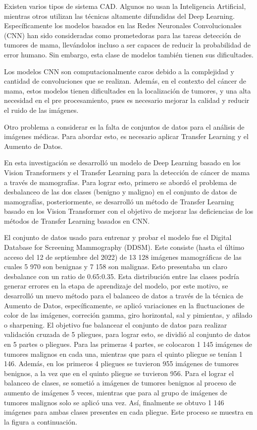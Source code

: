 Existen varios tipos de sistema CAD. Algunos no usan la Inteligencia Artificial, mientras otros utilizan las técnicas altamente difundidas del Deep Learning. Específicamente los modelos basados en las Redes Neuronales Convolucionales (CNN) han sido consideradas como prometedoras para las tareas detección de tumores de mama, llevándolos incluso a ser capaces de reducir la probabilidad de error humano. Sin embargo, esta clase de modelos también tienen sus dificultades. 

Los modelos CNN son computacionalmente caros debido a la complejidad y cantidad de convoluciones que se realizan. Además, en el contexto del cáncer de mama, estos modelos tienen dificultades en la localización de tumores, y una alta necesidad en el pre procesamiento, pues es necesario mejorar la calidad y reducir el ruido de las imágenes.

Otro problema a considerar es la falta de conjuntos de datos para el análisis de imágenes médicas. Para abordar esto, es necesario aplicar Transfer Learning y el Aumento de Datos.

En esta investigación se desarrolló un modelo de Deep Learning basado en los Vision Transformers y el Transfer Learning para la detección de cáncer de mama a través de mamografías. Para lograr esto, primero se abordó el problema de desbalanceo de las dos clases (benigno y maligno) en el conjunto de datos de mamografías, posteriormente, se desarrolló un método de Transfer Learning basado en los Vision Transformer con el objetivo de mejorar las deficiencias de los métodos de Transfer Learning basados en CNN.

El conjunto de datos usado para entrenar y probar el modelo fue el Digital Database for Screening Mammography (DDSM). Este consiste (hasta el último acceso del 12 de septiembre del 2022) de 13 128 imágenes mamográficas de las cuales 5 970 son benignas y 7 158 son malignas. Esto presentaba un claro desbalance con un ratio de 0.65:0.35. Esta distribución entre las clases podría generar errores en la etapa de aprendizaje del modelo, por este motivo, se desarrolló un nuevo método para el balanceo de datos a través de la técnica de Aumento de Datos, específicamente, se aplicó variaciones en la fluctuaciones de color de las imágenes, correción gamma, giro horizontal, sal y pimientas, y afilado o sharpening. El objetivo fue balancear el conjunto de datos para realizar validación cruzada de 5 pliegues, para lograr esto, se dividió al conjunto de datos en 5 partes o pliegues. Para las primeras 4 partes, se colocaron 1 145 imágenes de tumores malignos en cada una, mientras que para el quinto pliegue se tenían  1 146. Además, en los primeros 4 pliegues se tuvieron 955 imágenes de tumores benignos, a la vez que en el quinto pliegue se tuvieron 956. Para el lograr el balanceo de clases, se sometió a  imágenes de tumores benignos al proceso de aumento de imágenes 5 veces, mientras que para al grupo de imágenes de tumores malignos solo se aplicó una vez. Así, finalmente se obtuvo 1 146 imágenes para ambas clases presentes en cada pliegue. Este proceso se muestra en la figura a continuación.

